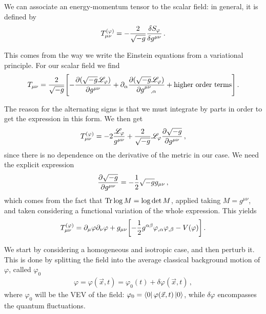 \documentclass[main.tex]{subfiles}
\begin{document}
We can associate an energy-momentum tensor to the scalar field: in general, it is defined by 
%
\begin{align}
T_{\mu \nu }^{(\varphi )} = - \frac{2}{\sqrt{-g}} \fdv{S_{\varphi }}{g^{\mu \nu }}
\,.
\end{align}

This comes from the way we write the Einstein equations from a variational principle. 
For our scalar field we find 
%
\begin{align}
T_{\mu \nu } = \frac{2}{\sqrt{-g}} \qty[
    -\pdv{(\sqrt{-g} \mathscr{L}_\varphi )}{g^{\mu \nu }}
    +
    \partial_{\alpha }
    \pdv{(\sqrt{-g} \mathscr{L}_\varphi )}{\tensor{g}{^{\mu \nu }_{,\alpha }}} 
    + \text{higher order terms}
]
\,.
\end{align}


The reason for the alternating signs is that we must integrate by parts in order to get the expression in this form. 
We then get 
%
\begin{align}
T^{(\varphi )}_{\mu \nu } = 
- 2 \frac{\mathscr{L}_\varphi }{g^{\mu \nu }} + \frac{2}{\sqrt{-g}} \mathscr{L}_\varphi \pdv{\sqrt{-g}}{g^{\mu \nu }}
\,,
\end{align}
%
since there is no dependence on the derivative of the metric in our case. We need the explicit expression 
%
\begin{align}
\pdv{\sqrt{-g}}{g^{\mu \nu }} = - \frac{1}{2} \sqrt{-g} g_{\mu \nu }
\,,
\end{align}
%
which comes from the fact that \(\Tr \log M = \log \det M\), applied taking \(M = g^{\mu \nu }\), and taken considering a functional variation of the whole expression. 
This yields 
%
\begin{align}
T^{(\varphi )}_{\mu \nu } = \partial_{\mu } \varphi \partial_{\nu } \varphi 
+ g_{\mu \nu } \qty[- \frac{1}{2} g^{\alpha \beta } \varphi_{, \alpha } \varphi_{, \beta } - V(\varphi )] 
\,.
\end{align}

We start by considering a homogeneous and isotropic case, and then perturb it. This is done by splitting the field into the average classical background motion of \(\varphi \), called \(\varphi_0 \) 
%
\begin{align}
\varphi = \varphi (\vec{x}, t) = \varphi_0 (t) + \delta \varphi (\vec{x}, t)
\,,
\end{align}
%
where \(\varphi_0 \) will be the VEV of the field: \(\varphi_0 = \bra{0} \varphi (\vec{x}, t) \ket{0}\), while \(\delta \varphi \) encompasses the quantum fluctuations. 
\end{document}
